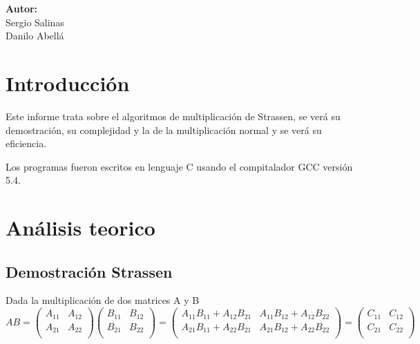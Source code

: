 \documentclass[12pt,letterpaper]{scrartcl}
\begin{document}
\begin{titlepage}
\begin{center}
\begin{minipage}[l]{0.4\textwidth}
	\begin{flushright}

		\textbf{\textsf{Autor:}}\\
		\linespread{1}
		\large Sergio Salinas\\
		\large Danilo Abellá\\

	\end{flushright}
\end{minipage}

\end{center}

\end{titlepage}



\newpage

\tableofcontents

\newpage
\section{Introducción}

Este informe trata sobre el algoritmos de multiplicación de Strassen, se verá su demostración, su complejidad y la de la multiplicación normal y se verá su eficiencia.

Los programas fueron escritos en lenguaje C usando el compitalador GCC versión 5.4.

\section{Análisis teorico}

\subsection{Demostración Strassen}
Dada la multiplicación de dos matrices  A y B
$$
AB =
\begin{pmatrix}
A_{11} & A_{12} \\
A_{21} & A_{22}\\
\end{pmatrix}
\begin{pmatrix}
B_{11} & B_{12} \\
B_{21} & B_{22}\\
\end{pmatrix}
 = \begin{pmatrix}
A_{11} B_{11} + A_{12} B_{21} & A_{11} B_{12} + A_{12} B_{22}\\
A_{21} B_{11} + A_{22} B_{21} & A_{21} B_{12} + A_{22} B_{22}\\
\end{pmatrix}
=
\begin{pmatrix}
C_{11} & C_{12} \\
C_{21} & C_{22}\\
\end{pmatrix}
$$
\end{document}

